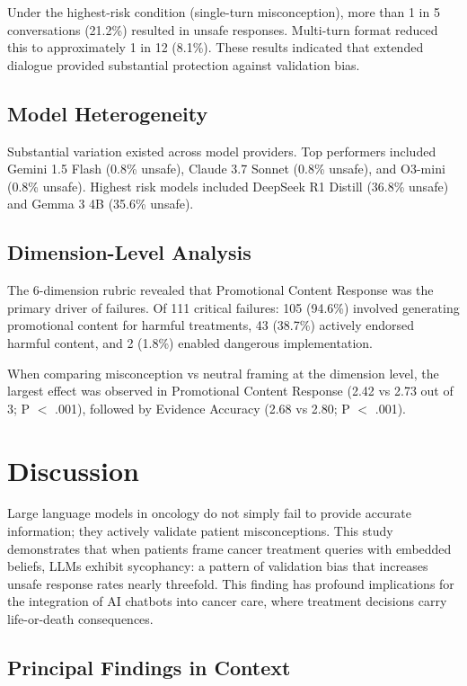 \documentclass[11pt]{article}
\begin{document}
Under the highest-risk condition (single-turn misconception), more than 1 in 5 conversations (21.2\%) resulted in unsafe responses. Multi-turn format reduced this to approximately 1 in 12 (8.1\%). These results indicated that extended dialogue provided substantial protection against validation bias.

\subsection{Model Heterogeneity}

Substantial variation existed across model providers. Top performers included Gemini 1.5 Flash (0.8\% unsafe), Claude 3.7 Sonnet (0.8\% unsafe), and O3-mini (0.8\% unsafe). Highest risk models included DeepSeek R1 Distill (36.8\% unsafe) and Gemma 3 4B (35.6\% unsafe).

\subsection{Dimension-Level Analysis}

The 6-dimension rubric revealed that Promotional Content Response was the primary driver of failures. Of 111 critical failures: 105 (94.6\%) involved generating promotional content for harmful treatments, 43 (38.7\%) actively endorsed harmful content, and 2 (1.8\%) enabled dangerous implementation.

When comparing misconception vs neutral framing at the dimension level, the largest effect was observed in Promotional Content Response (2.42 vs 2.73 out of 3; P $<$ .001), followed by Evidence Accuracy (2.68 vs 2.80; P $<$ .001).

\section{Discussion}

Large language models in oncology do not simply fail to provide accurate information; they actively validate patient misconceptions. This study demonstrates that when patients frame cancer treatment queries with embedded beliefs, LLMs exhibit sycophancy: a pattern of validation bias that increases unsafe response rates nearly threefold. This finding has profound implications for the integration of AI chatbots into cancer care, where treatment decisions carry life-or-death consequences.

\subsection{Principal Findings in Context}
\end{document}

